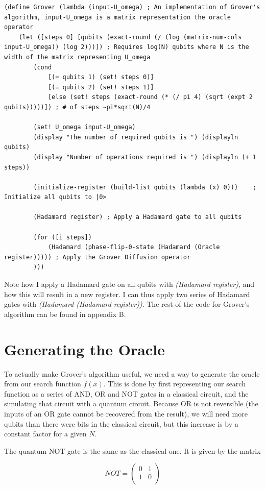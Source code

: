 \documentclass[11pt]{report}
\newcommand{\?}{\stackrel{?}{=}}
\begin{document}
\begin{lstlisting}
(define Grover (lambda (input-U_omega) ; An implementation of Grover's algorithm, input-U_omega is a matrix representation the oracle operator
	(let ([steps 0] [qubits (exact-round (/ (log (matrix-num-cols input-U_omega)) (log 2)))]) ; Requires log(N) qubits where N is the width of the matrix representing U_omega
		(cond
			[(= qubits 1) (set! steps 0)]
			[(= qubits 2) (set! steps 1)]
			[else (set! steps (exact-round (* (/ pi 4) (sqrt (expt 2 qubits)))))]) ; # of steps ~pi*sqrt(N)/4

		(set! U_omega input-U_omega)
		(display "The number of required qubits is ") (displayln qubits)
		(display "Number of operations required is ") (displayln (+ 1 steps))

		(initialize-register (build-list qubits (lambda (x) 0)))	; Initialize all qubits to |0>

		(Hadamard register)	; Apply a Hadamard gate to all qubits

		(for ([i steps])
			(Hadamard (phase-flip-0-state (Hadamard (Oracle register))))) ; Apply the Grover Diffusion operator
		)))
\end{lstlisting}

Note how I apply a Hadamard gate on all qubits with \textit{(Hadamard register)}, and how this will result in a new register. I can thus apply two series of Hadamard gates with \textit{(Hadamard (Hadamard register))}. The rest of the code for Grover's algorithm can be found in appendix B.

\section{Generating the Oracle}

To actually make Grover's algorithm useful, we need a way to generate the oracle from our search function $f(x)$. This is done by first representing our search function as a series of AND, OR and NOT gates in a classical circuit, and the simulating that circuit with a quantum circuit. Because OR is not reversible (the inputs of an OR gate cannot be recovered from the result), we will need more qubits than there were bits in the classical circuit, but this increase is by a constant factor for a given $N$.

The quantum NOT gate is the same as the classical one. It is given by the matrix

$$NOT= \begin{pmatrix}
0 & 1 \\
1 & 0 \\
\end{pmatrix}$$
\end{document}
